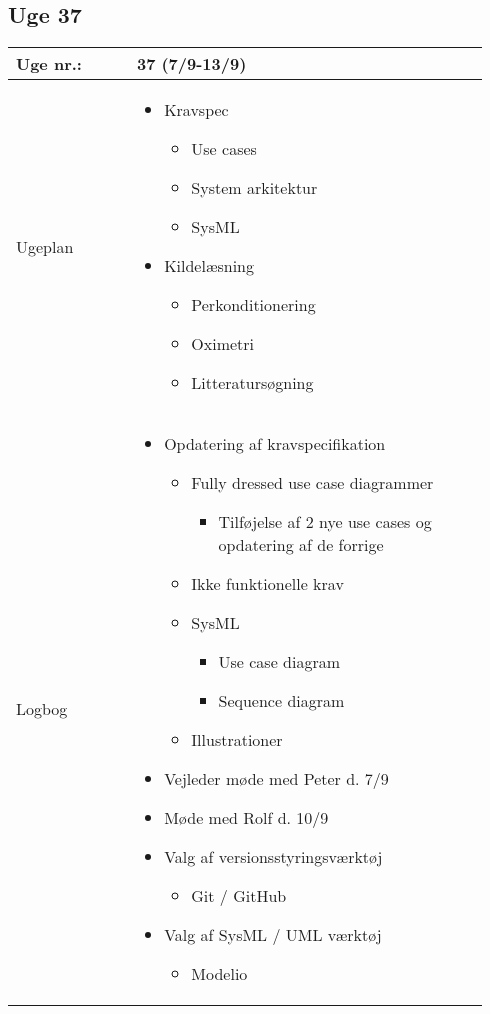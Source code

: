 	\subsection{Uge 37}
	\begin{longtable}{|p{0.24\linewidth}|p{0.7\linewidth}|}
		\hline
		Uge nr.: & 37 (7/9-13/9) \\ \hline
		Ugeplan & 
		\begin{itemize}
			\item Kravspec
			\begin{itemize}
				\item Use cases
				\item System arkitektur
				\item 	SysML
			\end{itemize}
			\item Kildelæsning
			\begin{itemize}
				\item 	Perkonditionering
				\item Oximetri 
				\item Litteratursøgning 
			\end{itemize}
		\end{itemize}
		
		\\ \hline
		Logbog & 
		\begin{itemize}
			\item Opdatering af kravspecifikation
			\begin{itemize}
				\item Fully dressed use case diagrammer
				\begin{itemize}
					\item Tilføjelse af 2 nye use cases og opdatering af de forrige
				\end{itemize}
				\item Ikke funktionelle krav
				\item SysML
				\begin{itemize}
					\item Use case diagram 
					\item Sequence diagram
				\end{itemize}
				\item Illustrationer 
			\end{itemize}
			\item Vejleder møde med Peter d. 7/9
			\item Møde med Rolf d. 10/9
			\item Valg af versionsstyringsværktøj
			\begin{itemize}
			\item 	Git / GitHub
			\end{itemize}
			\item Valg af SysML / UML værktøj
			\begin{itemize}
				\item Modelio 
			\end{itemize}
		\end{itemize}
		\\ \hline
	\end{longtable}
	
